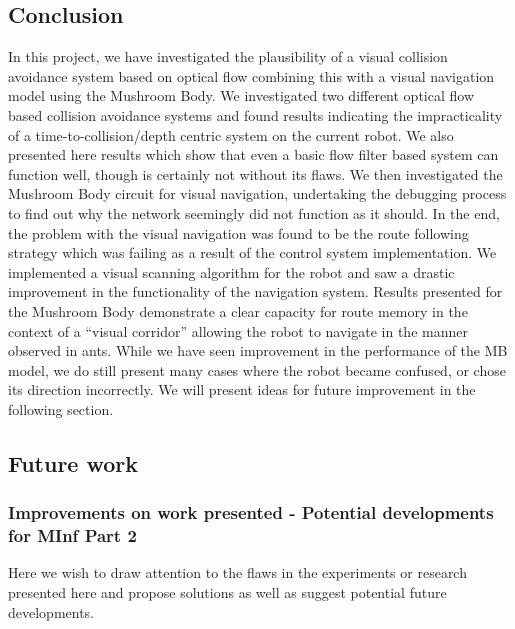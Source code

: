 \documentclass[a4paper,12pt,twoside,openright]{article}
\begin{document}
\subsection{Conclusion}
In this project, we have investigated the plausibility of a visual collision avoidance system based on optical flow combining
this with a visual navigation model using the Mushroom Body. We investigated two different optical flow based collision avoidance
systems and found results indicating the impracticality of a time-to-collision/depth centric system on the current robot. We
also presented here results which show that even a basic flow filter based system can function well, though is certainly
not without its flaws. We then investigated the Mushroom Body circuit for visual navigation, undertaking the debugging
process to find out why the network seemingly did not function as it should. In the end, the problem with the visual
navigation was found to be the route following strategy which was failing as a result of the control system implementation. We
implemented a visual scanning algorithm for the robot and saw a drastic improvement in the functionality of the navigation
system. Results presented for the Mushroom Body demonstrate a clear capacity for route memory in the context of a ``visual
corridor'' allowing the robot to navigate in the manner observed in ants. While we have seen improvement in the performance
of the MB model, we do still present many cases where the robot became confused, or chose its direction incorrectly. We will
present ideas for future improvement in the following section.

\subsection{Future work}
\subsubsection{Improvements on work presented - Potential developments for MInf Part 2}
Here we wish to draw attention to the flaws in the experiments or research presented here and propose solutions
as well as suggest potential future developments.
\newline
\end{document}
